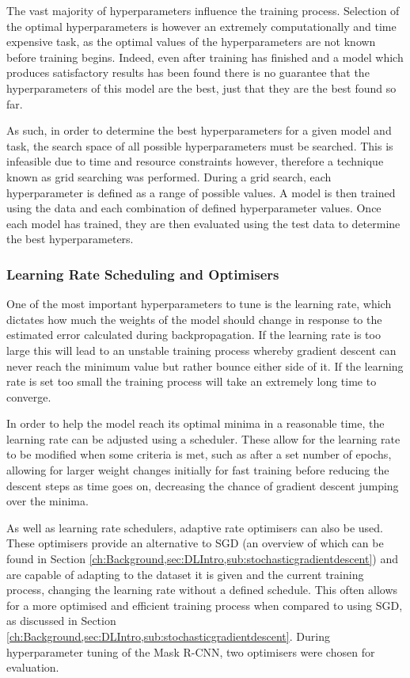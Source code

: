 The vast majority of hyperparameters influence the training process. Selection of the optimal hyperparameters is however an extremely computationally and time expensive task, as the optimal values of the hyperparameters are not known before training begins. Indeed, even after training has finished and a model which produces satisfactory results has been found there is no guarantee that the hyperparameters of this model are the best, just that they are the best found so far. 

As such, in order to determine the best hyperparameters for a given model and task, the search space of all possible hyperparameters must be searched. This is infeasible due to time and resource constraints however, therefore a technique known as grid searching was performed. During a grid search, each hyperparameter is defined as a range of possible values. A model is then trained using the data and each combination of defined hyperparameter values. Once each model has trained, they are then evaluated using the test data to determine the best hyperparameters.

\subsubsection{Learning Rate Scheduling and Optimisers}\label{ch:cetDet,sec:ModelSelection,sub:TrainingHyperparameters,subsub:learningRateOptimisers}
One of the most important hyperparameters to tune is the learning rate, which dictates how much the weights of the model should change in response to the estimated error calculated during backpropagation. If the learning rate is too large this will lead to an unstable training process whereby gradient descent can never reach the minimum value but rather bounce either side of it. If the learning rate is set too small the training process will take an extremely long time to converge. 

In order to help the model reach its optimal minima in a reasonable time, the learning rate can be adjusted using a scheduler. These allow for the learning rate to be modified when some criteria is met, such as after a set number of epochs, allowing for larger weight changes initially for fast training before reducing the descent steps as time goes on, decreasing the chance of gradient descent jumping over the minima.

As well as learning rate schedulers, adaptive rate optimisers can also be used. These optimisers provide an alternative to SGD (an overview of which can be found in Section \ref{ch:Background,sec:DLIntro,sub:stochasticgradientdescent}) and are capable of adapting to the dataset it is given and the current training process, changing the learning rate without a defined schedule. This often allows for a more optimised and efficient training process when compared to using SGD, as discussed in Section \ref{ch:Background,sec:DLIntro,sub:stochasticgradientdescent}. During hyperparameter tuning of the Mask R-CNN, two optimisers were chosen for evaluation. 

